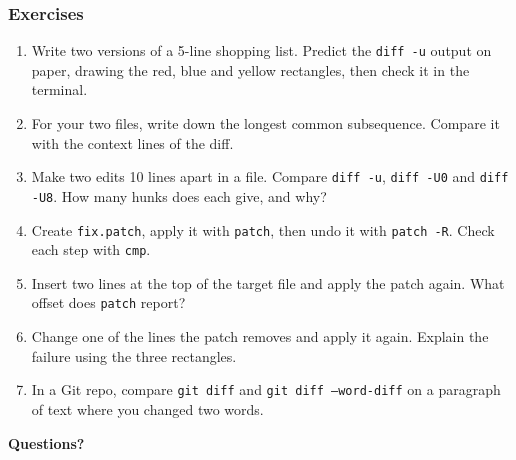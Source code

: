 \documentclass[aspectratio=169,10pt,compress]{beamer}
\begin{document}
\begin{frame}[t,fragile] \frametitle{Exercises}
\begin{enumerate}\small
  \item Write two versions of a 5-line shopping list. Predict the \texttt{diff -u} output on paper,
        drawing the red, blue and yellow rectangles, then check it in the terminal.
  \item For your two files, write down the longest common subsequence. Compare it with the
        context lines of the diff.
  \item Make two edits 10 lines apart in a file. Compare \texttt{diff -u}, \texttt{diff -U0} and
        \texttt{diff -U8}. How many hunks does each give, and why?
  \item Create \texttt{fix.patch}, apply it with \texttt{patch}, then undo it with \texttt{patch -R}.
        Check each step with \texttt{cmp}.
  \item Insert two lines at the top of the target file and apply the patch again. What offset
        does \texttt{patch} report?
  \item Change one of the lines the patch removes and apply it again. Explain the failure
        using the three rectangles.
  \item In a Git repo, compare \texttt{git diff} and \texttt{git diff --word-diff} on a paragraph
        of text where you changed two words.
\end{enumerate}

\vspace{0.3em}
\begin{center}
  {\Large \textbf{Questions?}}
\end{center}
\end{frame}
\end{document}
